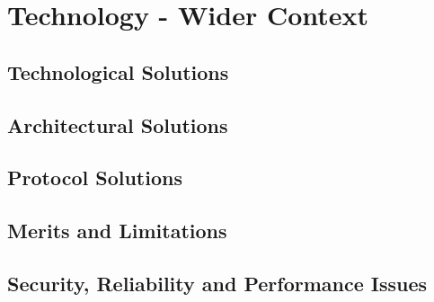 \chapter{Technology - Wider Context}

\section{Technological Solutions}
\section{Architectural Solutions}
\section{Protocol Solutions}
\section{Merits and Limitations}
\section{Security, Reliability and Performance Issues}

